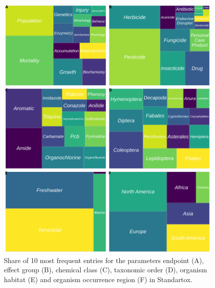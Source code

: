 \begin{figure}[h!]
    \includegraphics[width=1.0\textwidth]{article/figures/standartox_parameters.png}
    \caption{Share of 10 most frequent entries for the parameters endpoint (A), effect group (B), chemical class (C), taxonomic order (D), organism habitat (E) and organism occurrence region (F) in Standartox.}
    \label{fig:stx-parameters}
\end{figure}


